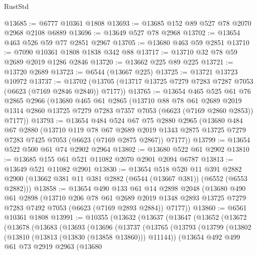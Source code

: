\begin{lexlean}{RustStd}
\begin{coremodule}
@13685 := @6777 @10361 @1808
@13693 := @13685 @152 @89 @527 @78 @2070 @2968 @2108 @6889
@13696 := @13649 @527 @78 @2968
@13702 := @13654 @463 @526 @59 @77 @2851 @2967
@13705 := @13680 @463 @59 @2851
@13710 := @7090 @10361 @1808 @1838 @342 @88
@13717 := @13710 @32 @78 @59 @2689 @2019 @1286 @2846
@13720 := @13662 @225 @89 @225
@13721 := @13720 @2689
@13723 := @6544 (@13667 @225)
@13725 := @13721 @13723 @10972
@13737 := @13702 (@13705 (@13717 @13725 @7279 @7283 @7287 @7053 (@6623 (@7169 @2846 @2840)) @7177))
@13765 := @13654
    @465
    @525
    @61
    @76
    @2865
    @2966
    (@13680
      @465
      @61
      @2865
      (@13710
        @88
        @78
        @61
        @2689
        @2019
        @1314
        @2860
        @13725
        @7279
        @7283
        @7357
        @7053
        (@6623 (@7169 @2860 @2853))
        @7177))
@13793 := @13654
    @484
    @524
    @67
    @75
    @2880
    @2965
    (@13680
      @484
      @67
      @2880
      (@13710
        @119
        @78
        @67
        @2689
        @2019
        @1343
        @2875
        @13725
        @7279
        @7283
        @7425
        @7053
        (@6623 (@7169 @2875 @2867))
        @7177))
@13799 := @13654 @522 @500 @61 @74 @2902 @2964
@13802 := @13680 @522 @61 @2902
@13810 := @13685 @155 @61 @521 @11082 @2070 @2901 @2094 @6787
@13813 := @13649 @521 @11082 @2901
@13830 := @13654
    @518
    @520
    @11
    @391
    @2882
    @2900
    (@13662 @381 @11 @381 @2882 (@6544 (@13667 @381)) (@6552 (@6553 @2882)))
@13858 := @13654
    @490
    @133
    @61
    @14
    @2898
    @2048
    (@13680
      @490
      @61
      @2898
      (@13710
        @206
        @78
        @61
        @2689
        @2019
        @1348
        @2893
        @13725
        @7279
        @7283
        @7492
        @7053
        (@6623 (@7169 @2893 @2884))
        @7177))
@13860 := @6561 @10361 @1808
@13991 := @10355
    (@13632
      (@13637
        (@13647
          (@13652
            (@13672
              (@13678
                (@13683
                  (@13693
                    (@13696
                      (@13737
                        (@13765
                          (@13793
                            (@13799
                              (@13802 (@13810 (@13813 (@13830 (@13858 @13860))) @11144))
                              (@13654
                                @492
                                @499
                                @61
                                @73
                                @2919
                                @2963
                                (@13680

\end{coremodule}
\end{lexlean}

